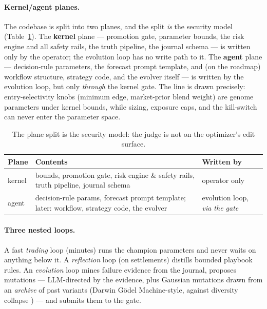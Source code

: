 \documentclass[sigconf,review,anonymous]{acmart}
\begin{document}
\paragraph{Kernel/agent planes.} The codebase is split into two planes, and the
split \emph{is} the security model (Table~\ref{tab:planes}). The \textbf{kernel}
plane --- promotion gate, parameter bounds, the risk engine and all safety rails,
the truth pipeline, the journal schema --- is written only by the operator; the
evolution loop has no write path to it. The \textbf{agent} plane --- decision-rule
parameters, the forecast prompt template, and (on the roadmap) workflow structure,
strategy code, and the evolver itself --- is written by the evolution loop, but
only \emph{through} the kernel gate. The line is drawn precisely:
entry-selectivity knobs (minimum edge, market-prior blend weight) are genome
parameters under kernel bounds, while sizing, exposure caps, and the kill-switch
can never enter the parameter space.

\begin{table}[t]
\centering
\small
\begin{tabular}{@{}p{1.3cm}p{4.2cm}p{1.7cm}@{}}
\toprule
\textbf{Plane} & \textbf{Contents} & \textbf{Written by} \\
\midrule
kernel & bounds, promotion gate, risk engine \& safety rails, truth pipeline, journal schema & operator only \\
agent & decision-rule params, forecast prompt template; later: workflow, strategy code, the evolver & evolution loop, \emph{via the gate} \\
\bottomrule
\end{tabular}
\caption{The plane split is the security model: the judge is not on the
optimizer's edit surface.}
\label{tab:planes}
\end{table}

\paragraph{Three nested loops.} A fast \emph{trading} loop (minutes) runs the
champion parameters and never waits on anything below it. A \emph{reflection} loop
(on settlements) distills bounded playbook rules. An \emph{evolution} loop mines
failure evidence from the journal, proposes mutations --- LLM-directed by the
evidence, plus Gaussian mutations drawn from an \emph{archive} of past variants
(Darwin G\"odel Machine-style, against diversity collapse \cite{dgm}) --- and
submits them to the gate.
\end{document}
